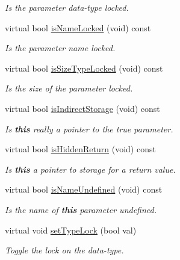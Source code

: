 \begin{DoxyCompactItemize}
\begin{DoxyCompactList}\small\item\em Is the parameter data-\/type locked. \end{DoxyCompactList}\item 
virtual bool \mbox{\hyperlink{class_parameter_basic_a5356f1c78cedff7576c3cd5d04c3ae91}{is\+Name\+Locked}} (void) const
\begin{DoxyCompactList}\small\item\em Is the parameter name locked. \end{DoxyCompactList}\item 
virtual bool \mbox{\hyperlink{class_parameter_basic_ab8644a632a02193f26e4499bbfa7dbc9}{is\+Size\+Type\+Locked}} (void) const
\begin{DoxyCompactList}\small\item\em Is the size of the parameter locked. \end{DoxyCompactList}\item 
virtual bool \mbox{\hyperlink{class_parameter_basic_a9f09a6b3c75b4a3161b789fda98edc4a}{is\+Indirect\+Storage}} (void) const
\begin{DoxyCompactList}\small\item\em Is {\bfseries{this}} really a pointer to the true parameter. \end{DoxyCompactList}\item 
virtual bool \mbox{\hyperlink{class_parameter_basic_aace2399bb8a2f988757037b1b62862e3}{is\+Hidden\+Return}} (void) const
\begin{DoxyCompactList}\small\item\em Is {\bfseries{this}} a pointer to storage for a return value. \end{DoxyCompactList}\item 
virtual bool \mbox{\hyperlink{class_parameter_basic_a0385f1293c9dffdb691c479e7b82a239}{is\+Name\+Undefined}} (void) const
\begin{DoxyCompactList}\small\item\em Is the name of {\bfseries{this}} parameter undefined. \end{DoxyCompactList}\item 
virtual void \mbox{\hyperlink{class_parameter_basic_a70625ea5b34cdbe76fab93a029b6eb55}{set\+Type\+Lock}} (bool val)
\begin{DoxyCompactList}\small\item\em Toggle the lock on the data-\/type. \end{DoxyCompactList}\item 

\end{DoxyCompactItemize}
